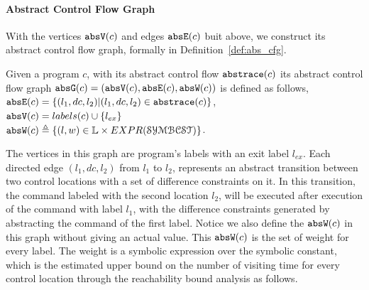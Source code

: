 %
\paragraph{Abstract Control Flow Graph} 
With the vertices $\mathtt{abs}{\mathtt{V}}(c)$ and edges $\mathtt{abs}{\mathtt{E}}(c)$ buit above, we construct its abstract control flow graph, formally 
in 
Definition~\ref{def:abs_cfg}.
\begin{defn}
\label{def:abs_cfg}
Given a program $c$, 
with its abstract control flow $\mathtt{abs}{\mathtt{trace}}(c)$
its abstract control flow graph $\mathtt{abs}{\mathtt{G}}(c) =(\mathtt{abs}{\mathtt{V}}(c), \mathtt{abs}{\mathtt{E}}(c), \mathtt{abs}{\mathtt{W}}(c))$ is defined as follows,
\\
%
$\mathtt{abs}{\mathtt{E}}(c) = \{(l_1, dc, l_2) | (l_1, dc, l_2) \in \mathtt{abs}{\mathtt{trace}}(c)\}$,
\\
$\mathtt{abs}{\mathtt{V}}(c) = labels(c)\cup\{l_{ex}\}$
\\
 $\absW(c) 
\triangleq \left\{ (l, w) \in \mathbb{L} \times EXPR(\constdom) \right\}$.
\end{defn}
% 
The vertices in this graph are program's labels with an exit label $l_{ex}$.
Each directed 
 edge $(l_1, dc, l_2)$ from $l_1$ to $l_2$,
 represents an abstract transition 
 between two control locations with a set of difference constraints on it.
In this transition, the  command labeled with the second location $l_2$, 
 will be executed after execution of the command with label $l_1$,
with the difference constraints generated by abstracting the command of the first label.
Notice we also define the $\mathtt{abs}{\mathtt{W}}(c)$ in this graph without giving an actual value.
This $\mathtt{abs}{\mathtt{W}}(c)$ is the set of weight for every 
label. The weight is a symbolic expression over the symbolic constant, 
which is the estimated upper bound on the number of visiting time for every control location
through the reachability bound analysis as follows.
%
%
